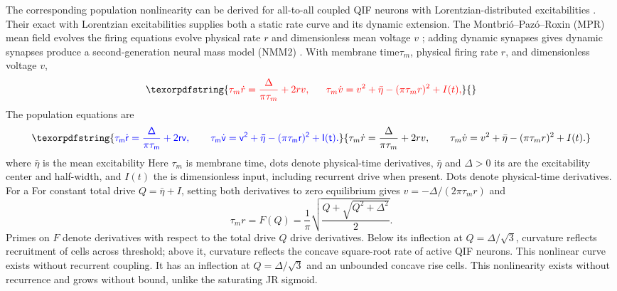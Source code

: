 \documentclass[11pt,a4paper]{article}
\providecommand{\DIFaddtex}[1]{{\protect\color{blue} \sf #1}} %
\providecommand{\DIFdeltex}[1]{{\protect\color{red} \scriptsize #1}} %
\providecommand{\DIFaddbegin}{} %
\providecommand{\DIFaddend}{} %
\providecommand{\DIFdelbegin}{} %
\providecommand{\DIFdelend}{} %
\providecommand{\DIFadd}[1]{\texorpdfstring{\DIFaddtex{#1}}{#1}} %
\providecommand{\DIFdel}[1]{\texorpdfstring{\DIFdeltex{#1}}{}} %
\begin{document}
\DIFdel{The corresponding population nonlinearity can be derived for all-to-all coupled
QIF neurons with Lorentzian-distributed excitabilities . Their exact
}\DIFdelend \DIFaddbegin \DIFadd{with Lorentzian excitabilities supplies both a static rate curve and its
dynamic extension. The }\DIFaddend Montbri\'o--Paz\'o--Roxin (MPR) \DIFdelbegin \DIFdel{mean field evolves the firing }\DIFdelend \DIFaddbegin \DIFadd{equations evolve physical
}\DIFaddend rate $r$ and \DIFaddbegin \DIFadd{dimensionless }\DIFaddend mean voltage $v$ \cite{montbrio2015}; \DIFdelbegin \DIFdel{adding dynamic
synapses gives }\DIFdelend \DIFaddbegin \DIFadd{dynamic
synapses produce }\DIFaddend a second-generation neural mass \DIFdelbegin \DIFdel{model }\DIFdelend (NMM2)
\cite{ruffini2021nmm2,clusella2023}. \DIFdelbegin \DIFdel{With membrane time$\tau_m$, physical firing rate $r$,
and dimensionless voltage $v$,
}\begin{displaymath}
\DIFdel{\tau_m\dot r=\frac{\Delta}{\pi\tau_m}+2rv,\qquad
\tau_m\dot v=v^2+\bar\eta-(\pi\tau_m r)^2+I(t),
}\end{displaymath}%
\DIFdelend \DIFaddbegin \DIFadd{The population equations are
}\begin{equation}
\DIFadd{\tau_m\dot r=\frac{\Delta}{\pi\tau_m}+2rv,\qquad
\tau_m\dot v=v^2+\bar\eta-(\pi\tau_m r)^2+I(t).
\label{eq:mpr}
}\end{equation}\DIFaddend
\DIFdelbegin \DIFdel{where $\bar\eta$ is the mean excitability }\DIFdelend \DIFaddbegin \DIFadd{Here $\tau_m$ is membrane time}\DIFaddend , \DIFaddbegin \DIFadd{dots denote physical-time derivatives,
$\bar\eta$ and }\DIFaddend $\Delta>0$ \DIFdelbegin \DIFdel{its }\DIFdelend \DIFaddbegin \DIFadd{are the excitability center and }\DIFaddend half-width, and
$I(t)$ \DIFdelbegin \DIFdel{the
}\DIFdelend \DIFaddbegin \DIFadd{is }\DIFaddend dimensionless input, including recurrent drive when present.
\DIFdelbegin \DIFdel{Dots denote physical-time derivatives. For a }\DIFdelend \DIFaddbegin \DIFadd{For }\DIFaddend constant total drive $Q=\bar\eta+I$, \DIFdelbegin \DIFdel{setting both derivatives to zero }\DIFdelend \DIFaddbegin \DIFadd{equilibrium }\DIFaddend gives
$v=-\Delta/(2\pi\tau_m r)$ and
\begin{equation}
\tau_m r=F(Q)=\frac{1}{\pi}\sqrt{\frac{Q+\sqrt{Q^2+\Delta^2}}{2}} .
\label{eq:Fmpr}
\end{equation}
Primes on $F$ denote \DIFdelbegin \DIFdel{derivatives with respect to the total drive $Q$}\DIFdelend \DIFaddbegin \DIFadd{drive derivatives}\DIFaddend . Below its inflection \DIFaddbegin \DIFadd{at
$Q=\Delta/\sqrt3$}\DIFaddend , curvature reflects recruitment \DIFdelbegin \DIFdel{of cells }\DIFdelend across threshold;
above it, \DIFdelbegin \DIFdel{curvature reflects }\DIFdelend the concave square-root rate of active \DIFdelbegin \DIFdel{QIF neurons. This nonlinear curve exists without recurrent coupling. It has an inflection at
$Q=\Delta/\sqrt3$ and an unbounded concave rise}\DIFdelend \DIFaddbegin \DIFadd{cells. This nonlinearity
exists without recurrence and grows without bound}\DIFaddend , unlike the \DIFdelbegin \DIFdel{saturating }\DIFdelend JR sigmoid.
\end{document}
